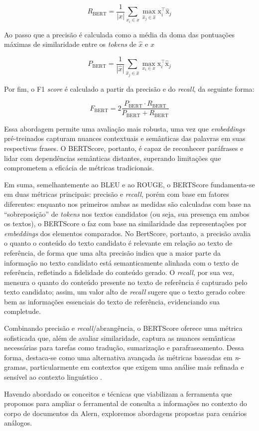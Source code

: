 \[
R_{\text{BERT}} = \frac{1}{|x|} \sum_{x_i \in x} \max_{\hat{x}_j \in \hat{x}} \text{x}_i^{\top} \hat{\text{x}}_j
\]

Ao passo que a precisão é calculada como a média da doma das pontuações máximas de similaridade entre os \textit{tokens} de \(\hat{x}\) e \(x\)

\[
P_{\text{BERT}} = \frac{1}{|\hat{x}|} \sum_{\hat{x}_j \in \hat{x}} \max_{x_i \in x} \text{x}_i^{\top} \hat{\text{x}}_j
\]

Por fim, o F1 \textit{score} é calculado a partir da precisão e do \textit{recall}, da seguinte forma:

\[
F_{\text{BERT}} = 2 \frac{P_{\text{BERT}} \cdot R_{\text{BERT}}}{P_{\text{BERT}} + R_{\text{BERT}}}
\]

Essa abordagem permite uma avaliação mais robusta, uma vez que \textit{embeddings} pré-treinados capturam nuances contextuais e semânticas das palavras em suas respectivas frases. O BERTScore, portanto, é capaz de reconhecer paráfrases e lidar com dependências semânticas distantes, superando limitações que comprometem a eficácia de métricas tradicionais.

Em suma, semelhantemente ao BLEU e ao ROUGE, o BERTScore fundamenta-se em duas métricas principais: precisão e \textit{recall}, porém com base em fatores diferentes: enquanto nos primeiros ambas as medidas são calculadas com base na ``sobreposição'' de \textit{tokens} nos textos candidatos (ou seja, sua presença em ambos os textos), o BERTScore o faz com base na similaridade das representações por \textit{embeddings} dos elementos comparados. No BertScore, portanto, a precisão avalia o quanto o conteúdo do texto candidato é relevante em relação ao texto de referência, de forma que uma alta precisão indica que a maior parte da informação no texto candidato está semanticamente alinhada com o texto de referência, refletindo a fidelidade do conteúdo gerado. O \textit{recall}, por sua vez, mensura o quanto do conteúdo presente no texto de referência é capturado pelo texto candidato; assim, um valor alto de \textit{recall} sugere que o texto gerado cobre bem as informações essenciais do texto de referência, evidenciando sua completude.

Combinando precisão e \textit{recall}/abrangência, o BERTScore oferece uma métrica sofisticada que, além de avaliar similaridade, captura as nuances semânticas necessárias para tarefas como tradução, sumarização e parafraseamento. Dessa forma, destaca-se como uma alternativa avançada às métricas baseadas em \textit{n}-gramas, particularmente em contextos que exigem uma análise mais refinada e sensível ao contexto linguístico \cite{BERTScore:1}.

Havendo abordado os conceitos e técnicas que viabilizam a ferramenta que propomos para ampliar o ferramental de consulta a informações no contexto do corpo de documentos da \ac{Alern}, exploremos abordagens propostas para cenários análogos.
